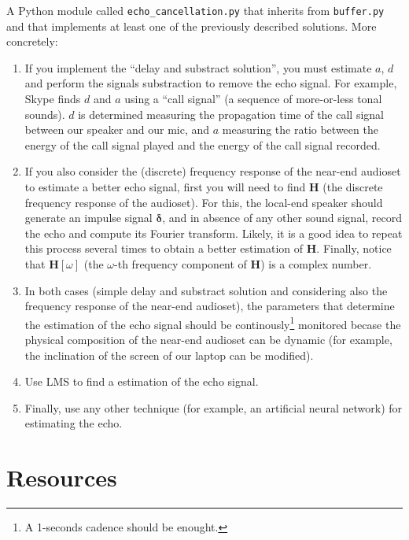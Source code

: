 A Python module called \texttt{echo\_cancellation.py} that inherits from
\texttt{buffer.py} and that implements at least one of the previously
described solutions. More concretely:
\begin{enumerate}
\item If you implement the ``delay and substract solution'', you must
  estimate $a$, $d$ and perform the signals substraction to remove the
  echo signal. For example, Skype finds $d$ and $a$ using a ``call
  signal'' (a sequence of more-or-less tonal sounds). $d$ is
  determined measuring the propagation time of the call signal between
  our speaker and our mic, and $a$ measuring the ratio between the
  energy of the call signal played and the energy of the call signal
  recorded.
\item If you also consider the (discrete) frequency response of the
  near-end audioset to estimate a better echo signal, first you will
  need to find ${\mathbf H}$ (the discrete frequency response of the
  audioset). For this, the local-end speaker should generate an
  impulse signal ${\mathbf \delta}$, and in absence of any other sound
  signal, record the echo and compute its Fourier transform. Likely,
  it is a good idea to repeat this process several times to obtain a
  better estimation of ${\mathbf H}$. Finally, notice that
  ${\mathbf H}[\omega]$ (the $\omega$-th frequency component of
  ${\mathbf H}$) is a complex number.
\item In both cases (simple delay and substract solution and
  considering also the frequency response of the near-end audioset),
  the parameters that determine the estimation of the echo signal
  should be continously\footnote{A 1-seconds cadence should be
    enought.} monitored becase the physical composition of the
  near-end audioset can be dynamic (for example, the inclination of
  the screen of our laptop can be modified).
\item Use LMS to find a estimation of the echo signal.
\item Finally, use any other technique (for example, an artificial
  neural network) for estimating the echo.
\end{enumerate}

\section{Resources}




